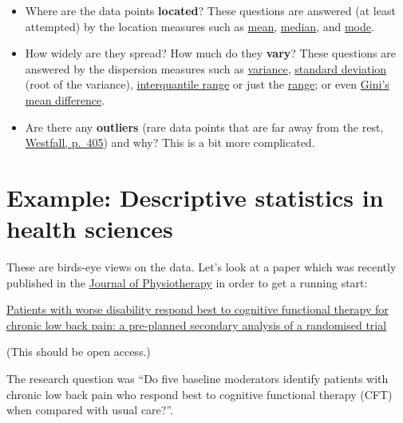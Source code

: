 \documentclass[
]{book}
\providecommand{\tightlist}{%
  \setlength{\itemsep}{0pt}\setlength{\parskip}{0pt}}
\begin{document}
\begin{itemize}
\tightlist
\item
  Where are the data points \textbf{located}?
  These questions are answered (at least attempted) by the location measures such as
  \href{https://en.wikipedia.org/wiki/Mean}{mean}, \href{https://en.wikipedia.org/wiki/Median}{median}, and \href{https://en.wikipedia.org/wiki/Mode_(statistics)}{mode}.
\item
  How widely are they spread? How much do they \textbf{vary}?
  These questions are answered by the dispersion measures such as \href{https://en.wikipedia.org/wiki/Variance}{variance},
  \href{https://en.wikipedia.org/wiki/Standard_deviation}{standard deviation} (root of the variance),
  \href{https://en.wikipedia.org/wiki/Interquartile_range\#:~:text=The\%20IQR\%20of\%20a\%20set,a\%20median\%20calculated\%20as\%20follows.&text=The\%20second\%20quartile\%20Q2\%20is\%20the\%20same\%20as\%20the\%20ordinary\%20median.}{interquantile range}
  or just the \href{https://en.wikipedia.org/wiki/Range_(statistics)}{range}; or even \href{https://www.dss.uniroma1.it/RePec/mtn/articoli/2003-2-8.pdf}{Gini's mean difference}.
\item
  Are there any \textbf{outliers} (rare data points that are far away from the rest, \href{https://www.routledge.com/Understanding-Regression-Analysis-A-Conditional-Distribution-Approach/Westfall-Arias/p/book/9780367493516}{Westfall, p.~405}) and why?
  This is a bit more complicated.
\end{itemize}

\section{Example: Descriptive statistics in health sciences}\label{example_study1_physio}

These are birds-eye views on the data. Let's look at a paper which was recently published in the
\href{https://www.sciencedirect.com/journal/journal-of-physiotherapy}{Journal of Physiotherapy} in order to get a running start:

\href{https://www.sciencedirect.com/science/article/pii/S183695532400081X?via\%3Dihub}{Patients with worse disability respond best to cognitive functional therapy for chronic low back pain: a pre-planned secondary analysis of a randomised trial}

(This should be open access.)

The research question was ``Do five baseline moderators identify patients with chronic low back pain who respond best to cognitive
functional therapy (CFT) when compared with usual care?''.
\end{document}
